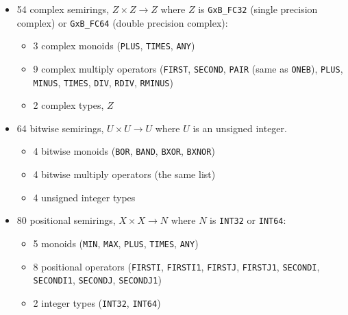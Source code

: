 \documentclass[12pt]{article}
\begin{document}
\begin{itemize}
\item 54 complex semirings, $Z \times Z \rightarrow Z$ where $Z$ is
    \verb'GxB_FC32' (single precision complex) or
    \verb'GxB_FC64' (double precision complex):

    \vspace{-0.05in}
    \begin{itemize}
    \item 3 complex monoids (\verb'PLUS', \verb'TIMES', \verb'ANY')
    \item 9 complex multiply operators
        (\verb'FIRST', \verb'SECOND', \verb'PAIR' (same as \verb'ONEB'),
        \verb'PLUS', \verb'MINUS',
            \verb'TIMES', \verb'DIV', \verb'RDIV', \verb'RMINUS')
    \item 2 complex types, $Z$
    \end{itemize}

\item 64 bitwise semirings, $U \times U \rightarrow U$ where $U$ is
    an unsigned integer.

    \vspace{-0.05in}
    \begin{itemize}
    \item 4 bitwise monoids (\verb'BOR', \verb'BAND', \verb'BXOR', \verb'BXNOR')
    \item 4 bitwise multiply operators (the same list)
    \item 4 unsigned integer types
    \end{itemize}

\item 80 positional semirings, $X \times X \rightarrow N$ where $N$ is
    \verb'INT32' or \verb'INT64':

    \vspace{-0.05in}
    \begin{itemize}
    \item 5 monoids (\verb'MIN', \verb'MAX', \verb'PLUS', \verb'TIMES', \verb'ANY')
    \item 8 positional operators
        (\verb'FIRSTI', \verb'FIRSTI1', \verb'FIRSTJ', \verb'FIRSTJ1',
        \verb'SECONDI', \verb'SECONDI1', \verb'SECONDJ', \verb'SECONDJ1')
    \item 2 integer types (\verb'INT32', \verb'INT64')
    \end{itemize}

\end{itemize}

\newpage
\end{document}
